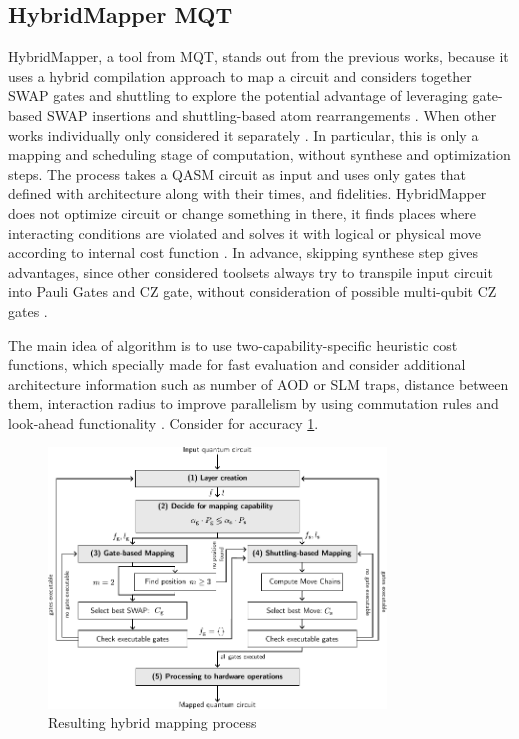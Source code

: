 \subsection{HybridMapper MQT}
HybridMapper, a tool from \ac{MQT}, stands out from the previous works, 
because it uses a hybrid compilation approach to map a circuit 
and considers together SWAP gates and shuttling to explore the potential advantage of leveraging gate-based SWAP insertions 
and shuttling-based atom rearrangements \parencite{schmid2023hybridcircuitmappingleveraging}.
When other works individually only considered it separately \parencite{Tan_2025_Enola,huang2025dasatomdivideandshuttleatomapproach,10082942}.
In particular, this is only a mapping and scheduling stage of computation, without synthese and optimization steps.
The process takes a QASM circuit as input and uses only gates that defined with architecture along with their times, and fidelities.
\ac{HybridMapper} does not optimize circuit or change something in there, it finds places where interacting conditions are violated 
and solves it with logical or physical move according to internal cost function \parencite{schmid2023hybridcircuitmappingleveraging}. 
In advance, skipping synthese step gives advantages, 
since other considered toolsets always try to transpile input circuit into Pauli Gates and CZ gate, without consideration of possible multi-qubit CZ gates \parencite{schmid2023hybridcircuitmappingleveraging}.

The main idea of algorithm is to use two-capability-specific heuristic cost functions, 
which specially made for fast evaluation 
and consider additional architecture information 
such as number of \ac{AOD} or \ac{SLM} traps, distance between them, interaction radius 
to improve parallelism by using commutation rules and look-ahead functionality \parencite{schmid2023hybridcircuitmappingleveraging}.
Consider for accuracy \ref{fig:overview_HybridMapper}.

\begin{figure}[htbp]
  \centering
    \includegraphics[width=0.8\textwidth]{figures/overviewHybridMapper.pdf}
    \caption{Resulting hybrid mapping process \parencite{schmid2023hybridcircuitmappingleveraging}}
    \label{fig:overview_HybridMapper}
\end{figure}
